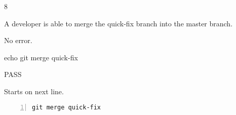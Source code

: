\begin{description}[align=right,leftmargin=3.2cm,labelindent=3.0cm]
\item[Step:] 8
\item[Confirm:] A developer is able to merge the quick-fix branch into the master branch.
\item[Expectation:] No error.
\item[Command:] echo git  merge quick-fix
\item[Test Result:] PASS
\item[Evidence:] Starts on next line.
\end{description}
\begin{lstlisting}[numbers=left]
git merge quick-fix

\end{lstlisting}
